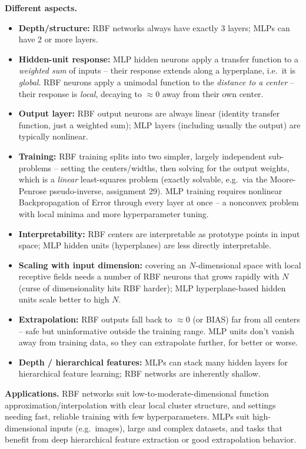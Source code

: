 \documentclass[11pt,a4paper]{article}
\begin{document}
\textbf{Different aspects.}
\begin{itemize}
  \item \textbf{Depth/structure:} RBF networks always have exactly 3 layers; MLPs can have 2 or
  more layers.
  \item \textbf{Hidden-unit response:} MLP hidden neurons apply a transfer function to a
  \emph{weighted sum} of inputs -- their response extends along a hyperplane, i.e.\ it is
  \emph{global}. RBF neurons apply a unimodal function to the \emph{distance to a center} -- their
  response is \emph{local}, decaying to $\approx 0$ away from their own center.
  \item \textbf{Output layer:} RBF output neurons are always linear (identity transfer function,
  just a weighted sum); MLP layers (including usually the output) are typically nonlinear.
  \item \textbf{Training:} RBF training splits into two simpler, largely independent
  sub-problems -- setting the centers/widths, then solving for the output weights, which is a
  \emph{linear} least-squares problem (exactly solvable, e.g.\ via the Moore-Penrose
  pseudo-inverse, assignment 29). MLP training requires nonlinear Backpropagation of Error through
  every layer at once -- a nonconvex problem with local minima and more hyperparameter tuning.
  \item \textbf{Interpretability:} RBF centers are interpretable as prototype points in input
  space; MLP hidden units (hyperplanes) are less directly interpretable.
  \item \textbf{Scaling with input dimension:} covering an $N$-dimensional space with local
  receptive fields needs a number of RBF neurons that grows rapidly with $N$ (curse of
  dimensionality hits RBF harder); MLP hyperplane-based hidden units scale better to high $N$.
  \item \textbf{Extrapolation:} RBF outputs fall back to $\approx 0$ (or BIAS) far from all
  centers -- safe but uninformative outside the training range. MLP units don't vanish away from
  training data, so they can extrapolate further, for better or worse.
  \item \textbf{Depth / hierarchical features:} MLPs can stack many hidden layers for hierarchical
  feature learning; RBF networks are inherently shallow.
\end{itemize}

\textbf{Applications.} RBF networks suit low-to-moderate-dimensional function
approximation/interpolation with clear local cluster structure, and settings needing fast, reliable
training with few hyperparameters. MLPs suit high-dimensional inputs (e.g.\ images), large and
complex datasets, and tasks that benefit from deep hierarchical feature extraction or good
extrapolation behavior.
\end{document}
